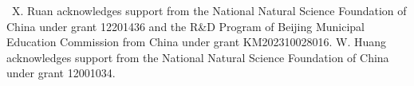 \documentclass[11pt]{article}
\begin{document}
\bigskip
{}  \ 
X. Ruan acknowledges support  from the National Natural Science Foundation of China under grant  12201436 and the R\&D Program of Beijing Municipal Education Commission
from China under grant KM202310028016.
W. Huang acknowledges support  from the National Natural Science Foundation of China under grant  12001034. 








%
%
%
%
%
\end{document}
